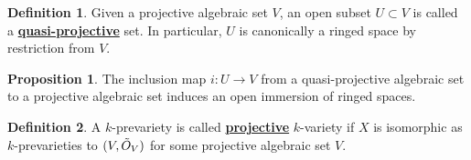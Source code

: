 \documentclass{article}
\theoremstyle{definition}
\theoremstyle{definition}
\newtheorem{definition}{Definition}[theorem]
\theoremstyle{definition}
\theoremstyle{definition}
\newtheorem{proposition}{Proposition}[theorem]
\theoremstyle{definition}
\theoremstyle{definition}
\theoremstyle{definition}
\begin{document}
\begin{tcolorbox}[colback=purple!5!white,colframe=purple!75!black]
\begin{definition}
Given a projective algebraic set $V$, an open subset $U\subset V$ is called a \underline{\textbf{quasi-projective}} set. In particular, $U$ is canonically a ringed space by restriction from $V$. 
\end{definition}
\end{tcolorbox}


\begin{tcolorbox}[colback=blue!5!white,colframe=blue!30!white]
\begin{proposition}
The inclusion map $i: U\to V$ from a quasi-projective algebraic set to a projective algebraic set induces an open immersion of ringed spaces. 
\end{proposition}
\end{tcolorbox}


\begin{tcolorbox}[colback=purple!5!white,colframe=purple!75!black]
    \begin{definition}
    A $k$-prevariety is called \underline{\textbf{projective}} $k$-variety if $X$ is isomorphic as $k$-prevarieties to $(V, \Tilde{O}_V)$ for some projective algebraic set $V$. 
    \end{definition}
    \end{tcolorbox}
    
\end{document}
